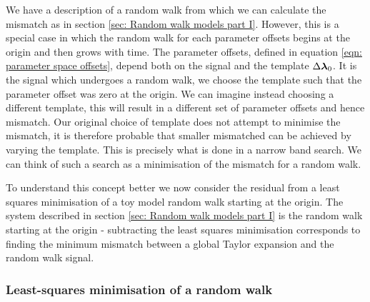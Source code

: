 
We have a description of a random walk from which we can calculate the mismatch
as in section \ref{sec: Random walk models part I}. However, this is a special
case in which the random walk for each parameter offsets begins at the origin
and then grows with time. The parameter offsets, defined in equation
\eqref{eqn: parameter space offsets}, depend both on the signal and the
template $\Delta \bm{\lambda}_{0}$.  It is the signal which undergoes a random walk, we choose
the template such that the parameter offset was zero at the origin. We can
imagine instead choosing a different template, this will result in a different
set of parameter offsets and hence mismatch. Our original choice of template 
does not attempt to minimise the mismatch, it is therefore probable that
smaller mismatched can be achieved by varying the template. This is precisely
what is done in a narrow band search. We can think of such a search as a 
minimisation of the mismatch for a random walk.

To understand this concept better we now consider the residual from a least squares
minimisation of a toy model random walk starting at the origin. The system
described in section \ref{sec: Random walk models part I} is the random walk
starting at the origin - subtracting the least squares minimisation corresponds
to finding the minimum mismatch between a global Taylor expansion and the
random walk signal.


\subsubsection{Least-squares minimisation of a random walk}
\label{sec: Least-squares minimisation of a random walk}


